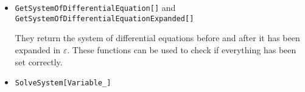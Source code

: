 \begin{itemize}
\begin{itemize}
        \item \texttt{MIs\_}: the list of master integrals, as they appear in the equations.\\
        \textit{Example:}
\begin{Verbatim}[commandchars=\\\{\}]
\{  B\textsubscript{1}[x,y], B\textsubscript{2}[x,y] \} 
\end{Verbatim}
        
        \item \texttt{Variables\_}: the list of variables appear in the equations, together with their Feynman prescriptions.\\
        \textit{Example:}
\begin{Verbatim}[commandchars=\\\{\}]
\{  x - I \textdelta, y + I \textdelta \} 
\end{Verbatim}       
        
        \item \texttt{PointBC\_}: the point in the phase-space in which the boundary conditions are imposed.\\
        \textit{Example:}
\begin{Verbatim}[commandchars=\\\{\}]
\{ 1, 1 \} 
\end{Verbatim}           
        
        \item \texttt{Param\_}: this is an optional parameter. Some equations might contain some external parameters, for example some masses \texttt{Mw}, \texttt{Mz}. This substitutions are performed before solving the system.\\
        \textit{Example:}
\begin{Verbatim}[commandchars=\\\{\}]
\{ MW -> 80.38, MZ -> 91.19 \} 
\end{Verbatim}        
    \end{itemize}
    
    \item \texttt{GetSystemOfDifferentialEquation[]} and\\ \texttt{GetSystemOfDifferentialEquationExpanded[]}
    
    They return the system of differential equations before and after it has been expanded in $\varepsilon$. These functions can be used to check if everything has been set correctly.
    
    \item \texttt{SolveSystem[Variable\_]} 
    

\end{itemize}
